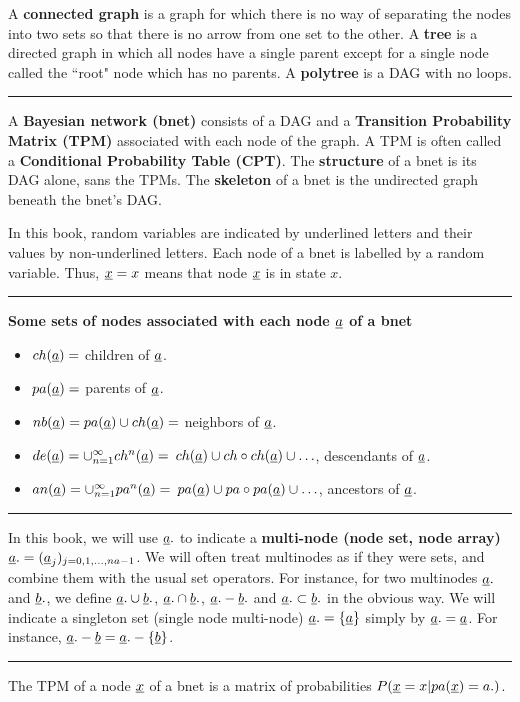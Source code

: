 A {\bf connected graph}
is a graph for which there
is no way of separating
the nodes into
two sets so that there is no arrow
from one set to the other.
A {\bf tree}
is a directed graph
in which all nodes
have a single parent
except for a single
node called the ``root" node
which has no parents.
A {\bf polytree}
is a DAG with
no loops.





\hrule

A {\bf Bayesian network (bnet)}
consists of a DAG
and a
{\bf Transition
Probability Matrix (TPM)}
associated
with each node
of the graph.
A TPM is often
called a {\bf Conditional Probability
Table
(CPT)}.
The {\bf structure} of a bnet
is its DAG alone, sans the TPMs.
The
{\bf skeleton} of a bnet is the
undirected graph beneath the bnet's
DAG.



In
this book,
random  variables are
 indicated by
underlined letters and their values
by non-underlined letters.
 Each node of a bnet is
 labelled by a random variable.
 Thus, ${\underline{x}}=x$ means that node
${\underline{x}}$ is in state $x$.

\hrule\noindent
{\bf Some sets of nodes
associated
with each node ${\underline{a}}$
of a bnet}
\begin{itemize}
\item
$ch({\underline{a}})=$ children of ${\underline{a}}$.
\item
$pa({\underline{a}})=$ parents of ${\underline{a}}$.
\item
$nb({\underline{a}})=pa({\underline{a}})\cup ch({\underline{a}})=$
neighbors of ${\underline{a}}$.
\item
$de({\underline{a}})=\cup_{n=1}^{\infty}ch^n({\underline{a}})=$
$ch({\underline{a}})\cup ch\circ ch({\underline{a}})\cup\ldots$,
descendants of ${\underline{a}}$.
\item
$an({\underline{a}})=\cup_{n=1}^{\infty}pa^n({\underline{a}})=$
$pa({\underline{a}})\cup pa\circ pa({\underline{a}})\cup\ldots$,
ancestors of ${\underline{a}}$.
\end{itemize}
\hrule
In this book,
we will use
${\underline{a}}.$
to indicate
a {\bf multi-node (node set,
node array)} ${\underline{a}}.=
({\underline{a}}_j)_{j=0, 1, \ldots , na-1}$.
We will often
treat multinodes as if
they were sets, and
combine them with
the usual
set
operators.
For instance,
for two
multinodes ${\underline{a}}.$
and ${\underline{b}}.$,
we define
${\underline{a}}.\cup{\underline{b}}.$,
${\underline{a}}.\cap{\underline{b}}.$,
${\underline{a}}.-{\underline{b}}.$
and
${\underline{a}}.\subset{\underline{b}}.$
in the obvious way.
We
will indicate
a singleton set (single
node multi-node) ${\underline{a}}.=\{{\underline{a}}\}$
simply by ${\underline{a}}.={\underline{a}}$.
For instance,
${\underline{a}}.-{\underline{b}}={\underline{a}}.-\{{\underline{b}}\}$.
\hrule

The TPM of a node
${\underline{x}}$ of a bnet
is a matrix of
probabilities
$P({\underline{x}}=x|pa({\underline{x}})=a.)$.

